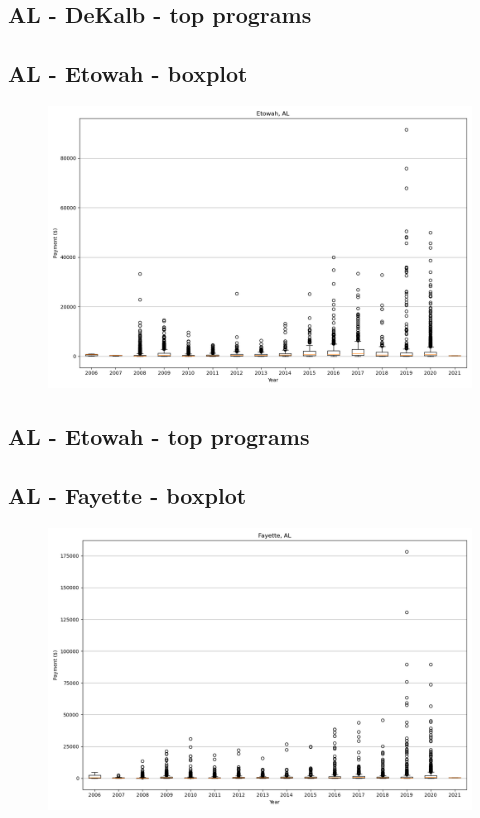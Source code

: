 \subsection*{AL - DeKalb - top programs}

\newpage
\subsection*{AL - Etowah - boxplot}
\begin{figure}[h]
\centering
\includegraphics[width=7in]{../output/boxplots/counties/Etowah-AL_boxplot.png}
\end{figure}


\subsection*{AL - Etowah - top programs}

\newpage
\subsection*{AL - Fayette - boxplot}
\begin{figure}[h]
\centering
\includegraphics[width=7in]{../output/boxplots/counties/Fayette-AL_boxplot.png}
\end{figure}


